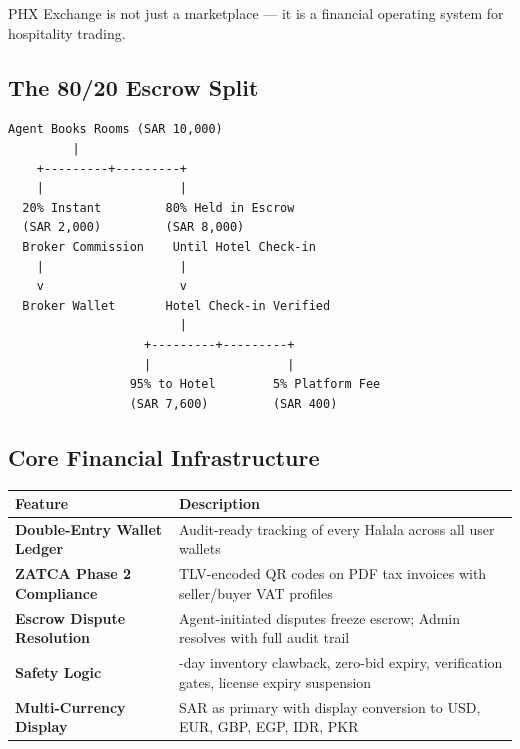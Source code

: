 \documentclass[11pt,a4paper]{article}
\begin{document}
PHX Exchange is not just a marketplace --- it is a financial operating system for hospitality trading.

\subsection*{The 80/20 Escrow Split}

\begin{verbatim}
Agent Books Rooms (SAR 10,000)
         |
    +---------+---------+
    |                   |
  20% Instant         80% Held in Escrow
  (SAR 2,000)         (SAR 8,000)
  Broker Commission    Until Hotel Check-in
    |                   |
    v                   v
  Broker Wallet       Hotel Check-in Verified
                        |
                   +---------+---------+
                   |                   |
                 95% to Hotel        5% Platform Fee
                 (SAR 7,600)         (SAR 400)
\end{verbatim}

\subsection*{Core Financial Infrastructure}

\begin{center}
\begin{tabular}{|>{\raggedright\arraybackslash}p{4.5cm}|>{\raggedright\arraybackslash}p{9.5cm}|}
\hline
\rowcolor{headergray}
\textbf{Feature} & \textbf{Description} \\
\hline
\textbf{Double-Entry Wallet Ledger} & Audit-ready tracking of every Halala across all user wallets \\
\hline
\textbf{ZATCA Phase 2 Compliance} & TLV-encoded QR codes on PDF tax invoices with seller/buyer VAT profiles \\
\hline
\textbf{Escrow Dispute Resolution} & Agent-initiated disputes freeze escrow; Admin resolves with full audit trail \\
\hline
\textbf{Safety Logic} & 7-day inventory clawback, zero-bid expiry, verification gates, license expiry suspension \\
\hline
\textbf{Multi-Currency Display} & SAR as primary with display conversion to USD, EUR, GBP, EGP, IDR, PKR \\
\hline
\end{tabular}
\end{center}

\newpage

\end{document}
